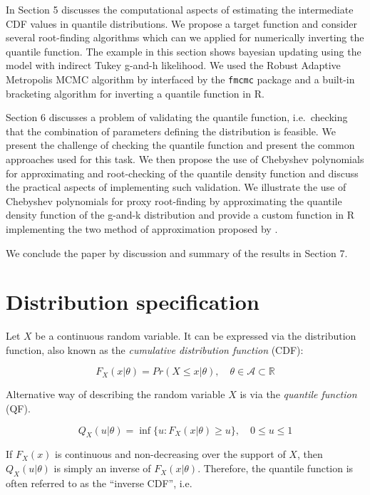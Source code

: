 \documentclass[
  12pt,
]{article}
\begin{document}
In Section 5 discusses the computational aspects of estimating the intermediate CDF values in quantile distributions. We propose a target function and consider several root-finding algorithms which can we applied for numerically inverting the quantile function. The example in this section shows bayesian updating using the model with indirect Tukey g-and-h likelihood. We used the Robust Adaptive Metropolis MCMC algorithm by \citet{vihola2012RobustAdaptiveMetropolis} interfaced by the \texttt{fmcmc} package \citep{vegayon2019FmcmcFriendlyMCMC} and a built-in bracketing algorithm for inverting a quantile function in R.

Section 6 discusses a problem of validating the quantile function, i.e.~checking that the combination of parameters defining the distribution is feasible. We present the challenge of checking the quantile function and present the common approaches used for this task. We then propose the use of Chebyshev polynomials \citep{boyd2006ComputingRealRoots} for approximating and root-checking of the quantile density function and discuss the practical aspects of implementing such validation. We illustrate the use of Chebyshev polynomials for proxy root-finding by approximating the quantile density function of the g-and-k distribution and provide a custom function in R implementing the two method of approximation proposed by \citet{boyd2013FindingZerosUnivariate}.

We conclude the paper by discussion and summary of the results in Section 7.

\hypertarget{distribution-specification}{%
\section{Distribution specification}\label{distribution-specification}}

Let \(X\) be a continuous random variable. It can be expressed via the distribution function, also known as the \emph{cumulative distribution function} (CDF):

\[
F_X(x | \theta)=Pr(X \leq x | \theta), \quad \theta \in \mathcal A \subset \mathbb R
\]

Alternative way of describing the random variable \(X\) is via the \emph{quantile function} (QF).

\[
Q_X(u | \theta)=\inf\{u:F_X(x|\theta)\geq u\}, \quad 0 \leq u\leq 1
\]

If \(F_X(x)\) is continuous and non-decreasing over the support of \(X\), then \(Q_X(u|\theta)\) is simply an inverse of \(F_X(x|\theta)\). Therefore, the quantile function is often referred to as the ``inverse CDF'', i.e.~
\end{document}
